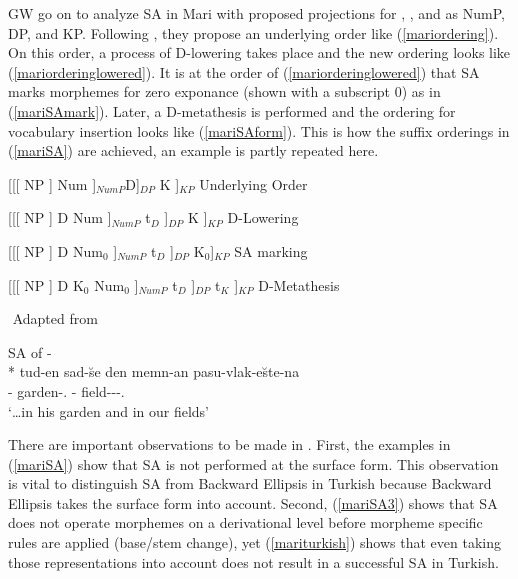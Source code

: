 GW go on to analyze SA in Mari with proposed projections for {\Poss}, {\Pl}, and {\Case} as NumP, DP, and KP. Following \citet{merchant2015ineffable}, they propose an underlying order like (\ref{mariordering}). On this order, a process of D-lowering takes place and the new ordering looks like (\ref{mariorderinglowered}). It is at the order of (\ref{mariorderinglowered}) that SA marks morphemes for zero exponance (shown with a subscript 0) as in (\ref{mariSAmark}). Later, a D-metathesis is performed and the ordering for vocabulary insertion looks like (\ref{mariSAform}). This is how the suffix orderings in (\ref{mariSA}) are achieved, an example is partly repeated here.
\begin{exe}
    \ex \begin{xlist}
    \ex \label{mariordering}
    [[[ NP ] Num ]$_{NumP}$D]$_{DP}$ K ]$_{KP}$ \hfill Underlying Order
    
     \ex \label{mariorderinglowered}
    [[[ NP ] D Num ]$_{NumP}$ t$_D$ ]$_{DP}$ K ]$_{KP}$ \hfill D-Lowering
    
    \ex \label{mariSAmark}
    [[[ NP ] D Num$_0$ ]$_{NumP}$ t$_D$ ]$_{DP}$ K$_0$]$_{KP}$ \hfill SA marking
    
    \ex \label{mariSAform}
    [[[ NP ] D K$_0$ Num$_0$ ]$_{NumP}$ t$_D$ ]$_{DP}$ t$_K$ ]$_{KP}$ \hfill D-Metathesis
    \end{xlist}
     ${}$ \hfill Adapted from \citet{guseva2017postsyntactic}

     SA of {\Pl-\Iness}\\*
    \gll tud-en sad-\u{s}e den memn-an pasu-vlak-e\u{s}te-na \\ 
    {\Tsg}-{\Gen} garden-{\Poss}.{\Tsg} {\And} {\Fpl}-{\Gen} field-{\Pl}-{\Iness}-{\Poss}.{\Fpl}\\ 
    \glt `\ldots in his garden and in our fields'
\end{exe}

There are important observations to be made in \citet{guseva2017postsyntactic}. First, the examples in (\ref{mariSA}) show that SA is not performed at the surface form. This observation is vital to distinguish SA from Backward Ellipsis in Turkish because Backward Ellipsis takes the surface form into account. Second, (\ref{mariSA3}) shows that SA does not operate morphemes on a derivational level before morpheme specific rules are applied (base/stem change), yet (\ref{mariturkish}) shows that even taking those representations into account does not result in a successful SA in Turkish.